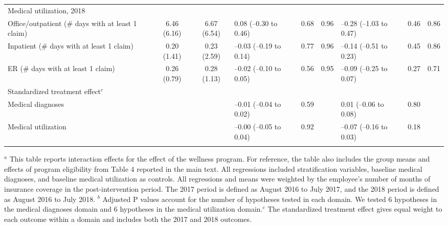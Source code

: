 \documentclass{article}
\begin{document}
\begin{landscape}
\begin{table}[tbp]
{\begin{tabularx}{\linewidth}{lCClCClCC}
Medical utilization, 2018&&&&&&&& \tabularnewline
\hspace{1em} Office/outpatient (\# days with at least 1 claim)&6.46  (6.16)&6.67  (6.54)&0.08 (--0.30 to 0.46)&0.68&0.96&--0.28 (--1.03 to 0.47)&0.46&0.86 \tabularnewline
\hspace{1em} Inpatient (\# days with at least 1 claim)&0.20  (1.41)&0.23  (2.59)&--0.03 (--0.19 to 0.14)&0.77&0.96&--0.14 (--0.51 to 0.23)&0.45&0.86 \tabularnewline
\hspace{1em} ER (\# days with at least 1 claim)&0.26  (0.79)&0.28  (1.13)&--0.02 (--0.10 to 0.05)&0.56&0.95&--0.09 (--0.25 to 0.07)&0.27&0.71 \tabularnewline
Standardized treatment effect$^{c}$&&&&&&&& \tabularnewline
\hspace{1em} Medical diagnoses&&&--0.01 (--0.04 to 0.02)&0.59&&0.01 (--0.06 to 0.08)&0.80& \tabularnewline
\hspace{1em} Medical utilization&&&--0.00 (--0.05 to 0.04)&0.92&&--0.07 (--0.16 to 0.03)&0.18& \tabularnewline
\bottomrule \addlinespace[\belowrulesep]

\end{tabularx}
\begin{flushleft}
\tiny $^{a}$ This table reports interaction effects for the effect of the wellness program. For reference, the table also includes the group means and effects of program eligibility from Table 4 reported in the main text. All regressions included stratification variables, baseline medical diagnoses, and baseline medical utilization as controls. All regressions and means were weighted by the employee's number of months of insurance coverage in the post-intervention period. The 2017 period is defined as August 2016 to July 2017, and the 2018 period is defined as August 2016 to July 2018. \newline $^{b}$ Adjusted P values account for the number of hypotheses tested in each domain. We tested 6 hypotheses in the medical diagnoses domain and 6 hypotheses in the medical utilization domain.\newline $^{c}$ The standardized treatment effect gives equal weight to each outcome within a domain and includes both the 2017 and 2018 outcomes.
\end{flushleft}
}
\end{table}
\end{landscape}
\end{document}
